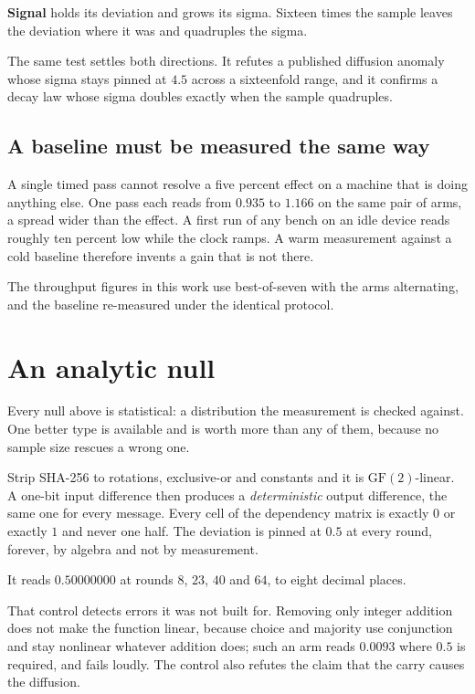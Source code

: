 \textbf{Signal} holds its deviation and grows its sigma. Sixteen times the sample leaves the deviation where it was and quadruples the sigma.

The same test settles both directions. It refutes a published diffusion anomaly whose sigma stays pinned at \(4.5\) across a sixteenfold range, and it confirms a decay law whose sigma doubles exactly when the sample quadruples.

\subsection{A baseline must be measured the same way}

A single timed pass cannot resolve a five percent effect on a machine that is doing anything else. One pass each reads from \(0.935\) to \(1.166\) on the same pair of arms, a spread wider than the effect. A first run of any bench on an idle device reads roughly ten percent low while the clock ramps. A warm measurement against a cold baseline therefore invents a gain that is not there.

The throughput figures in this work use best-of-seven with the arms alternating, and the baseline re-measured under the identical protocol.

\section{An analytic null}

Every null above is statistical: a distribution the measurement is checked against. One better type is available and is worth more than any of them, because no sample size rescues a wrong one.

Strip SHA-256 to rotations, exclusive-or and constants and it is \(\mathrm{GF}(2)\)-linear. A one-bit input difference then produces a \emph{deterministic} output difference, the same one for every message. Every cell of the dependency matrix is exactly \(0\) or exactly \(1\) and never one half. The deviation is pinned at \(0.5\) at every round, forever, by algebra and not by measurement.

It reads \(0.50000000\) at rounds \(8\), \(23\), \(40\) and \(64\), to eight decimal places.

That control detects errors it was not built for. Removing only integer addition does not make the function linear, because choice and majority use conjunction and stay nonlinear whatever addition does; such an arm reads \(0.0093\) where \(0.5\) is required, and fails loudly. The control also refutes the claim that the carry causes the diffusion.

